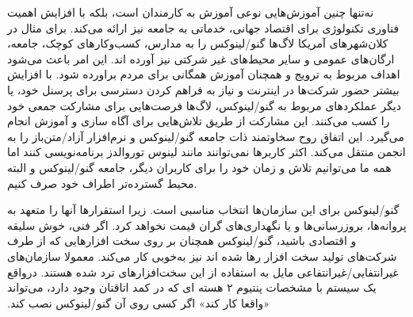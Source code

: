 نه‌تنها چنین آموزش‌هایی نوعی آموزش به کارمندان است، بلکه با افزایش
اهمیت فناوری تکنولوژی برای اقتصاد جهانی، خدماتی به جامعه نیز ارائه می‌کند.
برای مثال در کلان‌شهر‌های آمریکا لاگ‌ها گنو/لینوکس را به مدارس، کسب‌و‌کار‌های کوچک،
جامعه،  ارگان‌های عمومی و سایر محیط‌های غیر شرکتی نیز آورده اند.
این امر باعث می‌شود اهداف مربوط به ترویج و همچنان آموزش همگانی برای مردم براورده شود.
با افزایش بیشتر حضور شرکت‌ها در اینترنت و نیاز به فراهم کردن دسترسی برای پرسنل خود،
یا دیگر عملکرد‌های مربوط به گنو/لینوکس، لاگ‌ها فرصت‌هایی برای مشارکت جمعی خود را کسب می‌کنند.
این مشارکت از طریق تلاش‌هایی برای آگاه سازی و آموزش انجام می‌گیرد.
این اتفاق روح سخاوتمند ذات جامعه گنو/لینوکس و نرم‌افزار‌ آزاد/متن‌باز را به انجمن منتقل می‌کند.
اکثر کاربرها نمی‌توانند مانند لینوس توروالدز برنامه‌نویسی کنند اما همه ما می‌توانیم تلاش و زمان خود را
برای کاربران دیگر، جامعه گنو/لینوکس و البته محیط گسترده‌تر اطراف خود صرف کنیم.

گنو/لینوکس برای این سازمان‌ها انتخاب مناسبی است. زیرا استقرارها
آنها را متعهد به پروانه‌ها، بروزرسانی‌ها و یا نگهداری‌های گران قیمت
نخواهد کرد. اگر فنی، خوش سلیقه و اقتصادی باشید، گنو/لینوکس همچنان بر روی
سخت افزار‌هایی که از طرف شرکت‌های تولید سخت افزار رها شده اند نیز ‫به‌خوبی
کار می‌کند. معمولا سازمان‌های غیرانتفایی/غیرانتفاعی مایل به استفاده از این
سخت‌افزار‌های ترد شده هستند. درواقع یک سیستم با مشخصات پنتیوم ۲ هسته ای
که در کمد اتاقتان وجود دارد، می‌تواند «واقعا کار کند» اگر کسی روی آن
گنو/لینوکس نصب کند.


